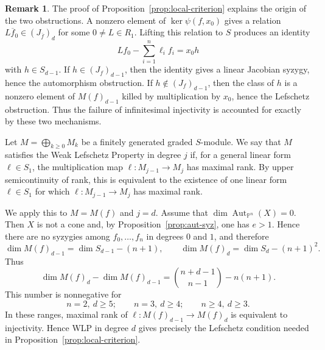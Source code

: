 \documentclass[11pt]{amsart}
\theoremstyle{plain}
\theoremstyle{definition}
\newtheorem{rk}[subsection]{Remark}
\numberwithin{equation}{section}
\newcommand{\PP}{\mathbb{P}}
\DeclareMathOperator{\Aut}{Aut}
\begin{document}
\begin{rk}
\label{rk:two-obstructions-mechanism}
The proof of Proposition~\ref{prop:local-criterion} explains the origin of the
two obstructions. A nonzero element of $\ker\psi(f,x_0)$ gives a relation
$L\overline f_0\in (J_{\overline f})_d$ for some $0\neq L\in R_1$. Lifting this
relation to $S$ produces an identity
\[
Lf_0-\sum_{i=1}^n\ell_i f_i=x_0h
\]
with $h\in S_{d-1}$. If $h\in (J_f)_{d-1}$, then the identity gives a linear
Jacobian syzygy, hence the automorphism obstruction. If
$h\notin (J_f)_{d-1}$, then the class of $h$ is a nonzero element of
$M(f)_{d-1}$ killed by multiplication by $x_0$, hence the Lefschetz obstruction.
Thus the failure of infinitesimal injectivity is accounted for exactly by these
two mechanisms.
\end{rk}


Let $M=\bigoplus_{k\geq0}M_k$ be a finitely generated graded $S$-module. We say
that $M$ satisfies the Weak Lefschetz Property in degree $j$ if, for a general
linear form $\ell\in S_1$, the multiplication map $\ell:M_{j-1}\to M_j$ has
maximal rank. By upper semicontinuity of rank, this is equivalent to the
existence of one linear form $\ell\in S_1$ for which $\ell:M_{j-1}\to M_j$ has
maximal rank.

We apply this to $M=M(f)$ and $j=d$. Assume that
$\dim\Aut_{\PP^n}(X)=0$. Then $X$ is not a cone and, by
Proposition~\ref{prop:aut-syz}, one has $e>1$. Hence there are no syzygies among
$f_0,\ldots,f_n$ in degrees $0$ and $1$, and therefore
\[
\dim M(f)_{d-1}=\dim S_{d-1}-(n+1),\qquad
\dim M(f)_d=\dim S_d-(n+1)^2.
\]
Thus
\[
\dim M(f)_d-\dim M(f)_{d-1}
=\binom{n+d-1}{n-1}-n(n+1).
\]
This number is nonnegative for
\[
n=2,\ d\geq5;\qquad n=3,\ d\geq4;\qquad n\geq4,\ d\geq3.
\]
In these ranges, maximal rank of $\ell:M(f)_{d-1}\to M(f)_d$ is equivalent to
injectivity. Hence WLP in degree $d$ gives precisely the Lefschetz condition
needed in Proposition~\ref{prop:local-criterion}.
\end{document}

